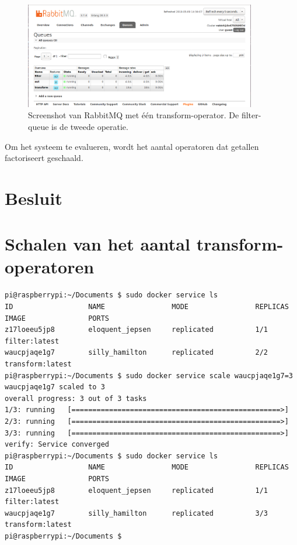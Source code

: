 \documentclass[twocolumn, a4paper]{article}
\begin{document}
\begin{figure}[htb]
    \centering
    \includegraphics[width=0.9\textwidth]{main_1_2}
    \caption{Screenshot van RabbitMQ met één transform-operator. De filter-queue is de tweede operatie.}\label{fig:dashboard}
\end{figure}
Om het systeem te evalueren, wordt het aantal operatoren dat getallen factoriseert geschaald. 


\section{Besluit}
\onecolumn

\appendix
\section{Schalen van het aantal transform-operatoren}\label{appendix:schalen}
\begin{verbatim}
pi@raspberrypi:~/Documents $ sudo docker service ls
ID                  NAME                MODE                REPLICAS            IMAGE               PORTS
z17loeeu5jp8        eloquent_jepsen     replicated          1/1                 filter:latest       
waucpjaqe1g7        silly_hamilton      replicated          2/2                 transform:latest    
pi@raspberrypi:~/Documents $ sudo docker service scale waucpjaqe1g7=3
waucpjaqe1g7 scaled to 3
overall progress: 3 out of 3 tasks 
1/3: running   [==================================================>] 
2/3: running   [==================================================>] 
3/3: running   [==================================================>] 
verify: Service converged 
pi@raspberrypi:~/Documents $ sudo docker service ls
ID                  NAME                MODE                REPLICAS            IMAGE               PORTS
z17loeeu5jp8        eloquent_jepsen     replicated          1/1                 filter:latest       
waucpjaqe1g7        silly_hamilton      replicated          3/3                 transform:latest    
pi@raspberrypi:~/Documents $ 
\end{verbatim}
\end{document}
